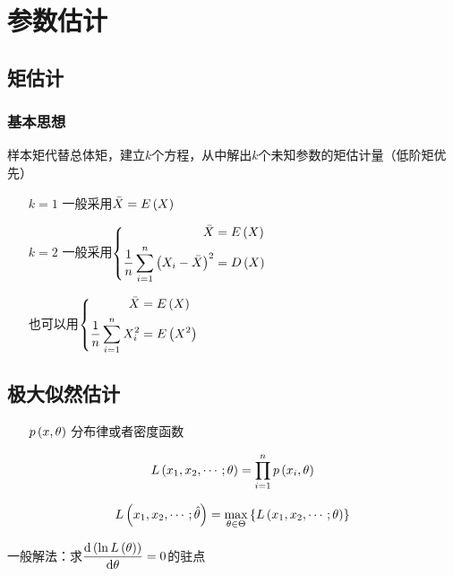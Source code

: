 \documentclass{article}
\begin{document}
\section{参数估计}

\subsection{矩估计}

\subsubsection{基本思想}

样本矩代替总体矩，建立$k$个方程，从中解出$k$个未知参数的矩估计量（低阶矩优先）

\begin{enumerate}
    \item [$k=1$] 一般采用$\bar X=E\left(X\right)$
    \item [$k=2$]
          一般采用$\left\{\begin{aligned}
                  \bar X                          & =E\left(X\right) \\
                  \frac1n\sum_{i=1}^n{\left(X_i-\bar X\right)}^2 & =D\left(X\right) \\
              \end{aligned}\right.$

          也可以用$\left\{\begin{aligned}
                  \bar X              & =E\left(X\right)   \\
                  \frac1n\sum_{i=1}^n X_i^2 & =E\left(X^2\right) \\
              \end{aligned}\right.$
\end{enumerate}

\subsection{极大似然估计}

\begin{enumerate}
    \item [$p\left(x,\theta\right)$] 分布律或者密度函数
\end{enumerate}

\[L\left(x_1,x_2,\cdots;\theta\right)=\prod_{i=1}^np\left(x_i,\theta\right)\]

\[L\left(x_1,x_2,\cdots;\hat\theta\right)=\max_{\theta\in\Theta}\left\{L\left(x_1,x_2,\cdots;\theta\right)\right\}\]

一般解法：求$\dfrac{\mathrm d\left(\ln L\left(\theta\right)\right)}{\mathrm d\theta}=0$的驻点
\end{document}
